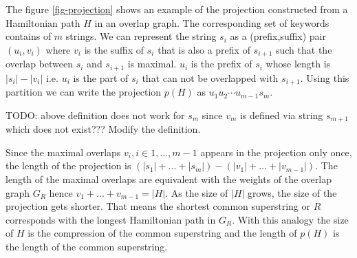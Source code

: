 \documentclass[english,twoside,censored,csm,algorithms-track-2020]{HYthesisML}
\theoremstyle{plain}
\theoremstyle{definition}
\begin{document}

The figure \ref{fig-projection} shows an example of the projection constructed from a
Hamiltonian path $H$ in an overlap graph. The corresponding set of keywords contains of
$m$ strings. We can represent the string $s_i$ as a (prefix,suffix) pair
$(u_i,v_i)$ where $v_i$ is the suffix of $s_i$ that is also a prefix of $s_{i+1}$ such that the
overlap between $s_i$ and $s_{i+1}$ is maximal. $u_i$ is the prefix of $s_i$ whose length is $|s_i|-|v_i|$
i.e. $u_i$ is the part of $s_i$ that can not be overlapped with $s_{i+1}$. Using this partition we can
write the projection $p(H)$ as $u_1u_2\cdots u_{m-1}s_m$.

TODO: above definition does not work for $s_m$ since $v_m$ is defined via string $s_{m+1}$
which does not exist??? Modify the definition.

Since the maximal overlaps $v_i,i\in1,...,m-1$ appears in the projection only once, the length of the
projection is $(|s_1|+...+|s_m|) - (|v_1|+...+|v_{m-1}|)$. The length of the maximal overlaps are equivalent
with the weights of the overlap graph $G_R$ hence $v_1+...+v_{m-1} = |H|$. As the size of $|H|$ grows, the size
of the projection gets shorter. That means the shortest common superstring or $R$ corresponds with the longest
Hamiltonian path in $G_R$. With this analogy the size of $H$ is the compression of the common superstring
and the length of $p(H)$ is the length of the common superstring.




\end{document}
